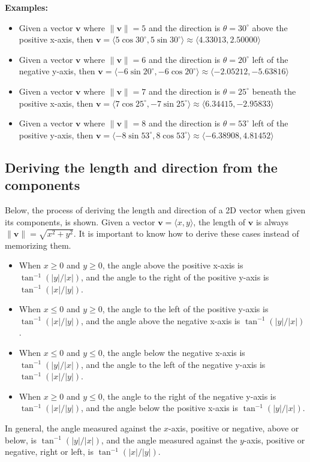 \documentclass{article}
\begin{document}
\textbf{Examples:}
\begin{itemize}
\item Given a vector \(\mathbf{v}\) where \(\|\mathbf{v}\| = 5\) and the direction is \(\theta = 30^\circ\) above the positive x-axis, then \(\mathbf{v} = \langle 5\cos 30^\circ, 5\sin 30^\circ \rangle \approx \langle 4.33013, 2.50000 \rangle\)
\item Given a vector \(\mathbf{v}\) where \(\|\mathbf{v}\| = 6\) and the direction is \(\theta = 20^\circ\) left of the negative y-axis, then \(\mathbf{v} = \langle -6\sin 20^\circ, -6\cos 20^\circ \rangle \approx \langle -2.05212, -5.63816 \rangle\)
\item Given a vector \(\mathbf{v}\) where \(\|\mathbf{v}\| = 7\) and the direction is \(\theta = 25^\circ\) beneath the positive x-axis, then \(\mathbf{v} = \langle 7\cos 25^\circ, -7\sin 25^\circ \rangle \approx \langle 6.34415, -2.95833 \rangle\)
\item Given a vector \(\mathbf{v}\) where \(\|\mathbf{v}\| = 8\) and the direction is \(\theta = 53^\circ\) left of the positive y-axis, then \(\mathbf{v} = \langle -8\sin 53^\circ, 8\cos 53^\circ \rangle \approx \langle -6.38908, 4.81452 \rangle\)
\end{itemize}



\subsection*{Deriving the length and direction from the components}

Below, the process of deriving the length and direction of a 2D vector when given its components, is shown. Given a vector \(\mathbf{v} = \langle x, y \rangle\), the length of \(\mathbf{v}\) is always \(\|\mathbf{v}\| = \sqrt{x^2 + y^2}\). It is important to know how to derive these cases instead of memorizing them.
\begin{itemize}
\item When \(x \geq 0\) and \(y \geq 0\), the angle above the positive x-axis is \(\tan^{-1}(|y|/|x|)\), and the angle to the right of the positive y-axis is \(\tan^{-1}(|x|/|y|)\).
\item When \(x \leq 0\) and \(y \geq 0\), the angle to the left of the positive y-axis is \(\tan^{-1}(|x|/|y|)\), and the angle above the negative x-axis is \(\tan^{-1}(|y|/|x|)\).
\item When \(x \leq 0\) and \(y \leq 0\), the angle below the negative x-axis is \(\tan^{-1}(|y|/|x|)\), and the angle to the left of the negative y-axis is \(\tan^{-1}(|x|/|y|)\).
\item When \(x \geq 0\) and \(y \leq 0\), the angle to the right of the negative y-axis is \(\tan^{-1}(|x|/|y|)\), and the angle below the positive x-axis is \(\tan^{-1}(|y|/|x|)\).
\end{itemize}
In general, the angle measured against the \(x\)-axis, positive or negative, above or below, is \(\tan^{-1}(|y|/|x|)\), and the angle measured against the \(y\)-axis, positive or negative, right or left, is \(\tan^{-1}(|x|/|y|)\).
\end{document}
